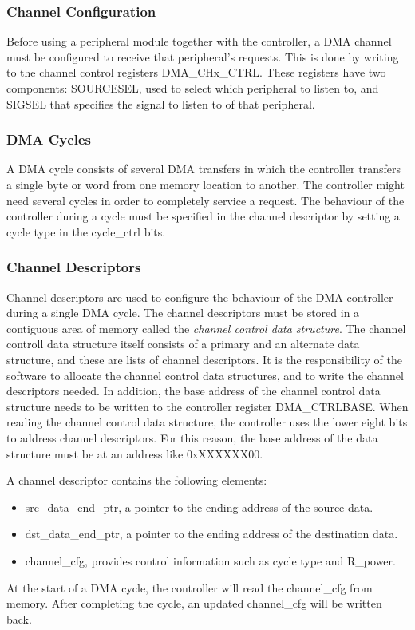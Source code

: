 \subsubsection{Channel Configuration}
Before using a peripheral module together with the controller, a DMA channel must be configured to receive that peripheral's requests. This is done by writing to the channel control registers DMA\_CHx\_CTRL. These registers have two components: SOURCESEL, used to select which peripheral to listen to, and SIGSEL that specifies the signal to listen to of that peripheral.

\subsubsection{DMA Cycles}
A DMA cycle consists of several DMA transfers in which the controller transfers a single byte or word from one memory location to another. The controller might need several cycles in order to completely service a request. The behaviour of the controller during a cycle must be specified in the channel descriptor by setting a cycle type in the cycle\_ctrl bits.

\subsubsection{Channel Descriptors}
Channel descriptors are used to configure the behaviour of the DMA controller during a single DMA cycle. The channel descriptors must be stored in a contiguous area of memory called the \emph{channel control data structure}. The channel controll data structure itself consists of a primary and an alternate data structure, and these are lists of channel descriptors. It is the responsibility of the software to allocate the channel control data structures, and to write the channel descriptors needed. In addition, the base address of the channel control data structure needs to be written to the controller register DMA\_CTRLBASE. When reading the channel control data structure, the controller uses the lower eight bits to address channel descriptors. For this reason, the base address of the data structure must be at an address like 0xXXXXXX00.

A channel descriptor contains the following elements:
\begin{itemize}
	\item src\_data\_end\_ptr, a pointer to the ending address of the source data.
	\item dst\_data\_end\_ptr, a pointer to the ending address of the destination data.
	\item channel\_cfg, provides control information such as cycle type and R\_power.
\end{itemize}
At the start of a DMA cycle, the controller will read the channel\_cfg from memory. After completing the cycle, an updated channel\_cfg will be written back.


